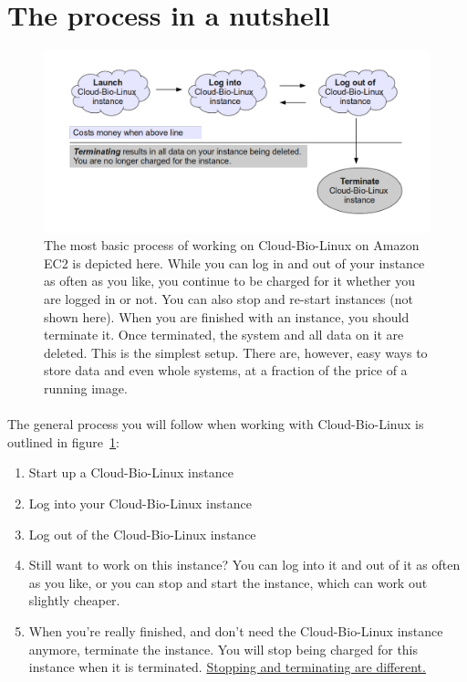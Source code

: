 \section{The process in a nutshell}

\begin{figure}[!hd]
	\fbox
	{
		\begin{minipage}{13cm}
\includegraphics[width=\maxwidth]{"images/nutshell"}
\caption[Start an Instance]{\label{fig:nutshell}The most basic process of working on Cloud-Bio-Linux on Amazon EC2 is depicted here. While you can log in and out of your instance as often as you like, you continue to be charged for it whether you are logged in or not. You can also stop and re-start instances (not shown here). When you are finished with an instance, you should terminate it. Once terminated, the system and all data on it are deleted. This is the simplest setup. There are, however, easy ways to store data and even whole systems, at a fraction of the price of a running image.}
		\end{minipage}
	}
\end{figure}

\paragraph{}The general process you will follow when working with Cloud-Bio-Linux is outlined in figure~\ref{fig:nutshell}:
\begin{enumerate}
\item Start up a Cloud-Bio-Linux instance
\item Log into your Cloud-Bio-Linux instance
\item Log out of the  Cloud-Bio-Linux instance
\item Still want to work on this instance? You can log into it and out of it as often as you like, or you can stop and start the instance, which can work out slightly cheaper.
\item When you're really finished, and don't need the Cloud-Bio-Linux instance anymore, terminate the instance. You will stop being charged for this instance when it is terminated. \href{http://support.rightscale.com/06-FAQs/FAQ\_0149\_-_What\%27s_the_difference_between_Terminating_and_Stopping_an_EC2_Instance\%3F}{Stopping and terminating are different.}
\end{enumerate}

